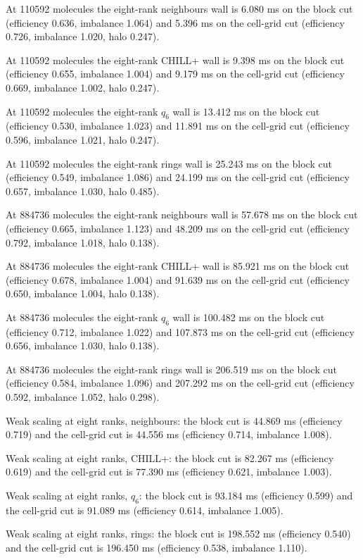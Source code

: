 At 110592 molecules the eight-rank neighbours wall is 6.080 ms on the block cut (efficiency 0.636, imbalance 1.064) and 5.396 ms on the cell-grid cut (efficiency 0.726, imbalance 1.020, halo 0.247).

At 110592 molecules the eight-rank CHILL+ wall is 9.398 ms on the block cut (efficiency 0.655, imbalance 1.004) and 9.179 ms on the cell-grid cut (efficiency 0.669, imbalance 1.002, halo 0.247).

At 110592 molecules the eight-rank $q_6$ wall is 13.412 ms on the block cut (efficiency 0.530, imbalance 1.023) and 11.891 ms on the cell-grid cut (efficiency 0.596, imbalance 1.021, halo 0.247).

At 110592 molecules the eight-rank rings wall is 25.243 ms on the block cut (efficiency 0.549, imbalance 1.086) and 24.199 ms on the cell-grid cut (efficiency 0.657, imbalance 1.030, halo 0.485).

At 884736 molecules the eight-rank neighbours wall is 57.678 ms on the block cut (efficiency 0.665, imbalance 1.123) and 48.209 ms on the cell-grid cut (efficiency 0.792, imbalance 1.018, halo 0.138).

At 884736 molecules the eight-rank CHILL+ wall is 85.921 ms on the block cut (efficiency 0.678, imbalance 1.004) and 91.639 ms on the cell-grid cut (efficiency 0.650, imbalance 1.004, halo 0.138).

At 884736 molecules the eight-rank $q_6$ wall is 100.482 ms on the block cut (efficiency 0.712, imbalance 1.022) and 107.873 ms on the cell-grid cut (efficiency 0.656, imbalance 1.030, halo 0.138).

At 884736 molecules the eight-rank rings wall is 206.519 ms on the block cut (efficiency 0.584, imbalance 1.096) and 207.292 ms on the cell-grid cut (efficiency 0.592, imbalance 1.052, halo 0.298).

Weak scaling at eight ranks, neighbours: the block cut is 44.869 ms (efficiency 0.719) and the cell-grid cut is 44.556 ms (efficiency 0.714, imbalance 1.008).

Weak scaling at eight ranks, CHILL+: the block cut is 82.267 ms (efficiency 0.619) and the cell-grid cut is 77.390 ms (efficiency 0.621, imbalance 1.003).

Weak scaling at eight ranks, $q_6$: the block cut is 93.184 ms (efficiency 0.599) and the cell-grid cut is 91.089 ms (efficiency 0.614, imbalance 1.005).

Weak scaling at eight ranks, rings: the block cut is 198.552 ms (efficiency 0.540) and the cell-grid cut is 196.450 ms (efficiency 0.538, imbalance 1.110).
